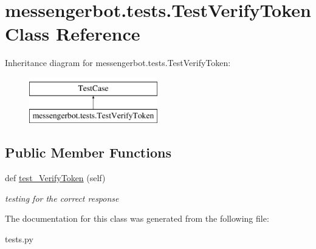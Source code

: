 \hypertarget{classmessengerbot_1_1tests_1_1TestVerifyToken}{}\section{messengerbot.\+tests.\+Test\+Verify\+Token Class Reference}
\label{classmessengerbot_1_1tests_1_1TestVerifyToken}
Inheritance diagram for messengerbot.\+tests.\+Test\+Verify\+Token\+:\begin{figure}[H]
\begin{center}
\leavevmode
\includegraphics[height=2.000000cm]{classmessengerbot_1_1tests_1_1TestVerifyToken}
\end{center}
\end{figure}
\subsection*{Public Member Functions}
\begin{DoxyCompactItemize}
\item 
\mbox{\label{classmessengerbot_1_1tests_1_1TestVerifyToken_a1613e92792aa6bd97d7056b5d68dee6a}} 
def \hyperlink{classmessengerbot_1_1tests_1_1TestVerifyToken_a1613e92792aa6bd97d7056b5d68dee6a}{test\+\_\+\+Verify\+Token} (self)
\begin{DoxyCompactList}\small\item\em testing for the correct response \end{DoxyCompactList}\end{DoxyCompactItemize}


The documentation for this class was generated from the following file\+:\begin{DoxyCompactItemize}
\item 
tests.\+py\end{DoxyCompactItemize}
